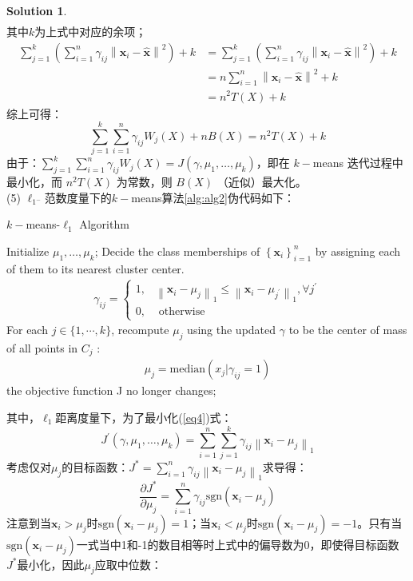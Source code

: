 \documentclass[a4paper,UTF8]{article}
\theoremstyle{definition}
\newtheorem*{solution}{Solution}
\begin{document}
\begin{solution}
\begin{align*}
	\end{align*}
	其中$k$为上式中对应的余项；
	\begin{align*}
	\sum_{j=1}^{k}\left(\sum_{i=1}^{n}\gamma_{i j}\left\|\mathbf{x}_{i}-\hat{\mathbf{x}}\right\|^{2}\right)+k&=\sum_{j=1}^{k}\left(\sum_{i=1}^{n}\gamma_{i j}\left\|\mathbf{x}_{i}-\hat{\mathbf{x}}\right\|^{2}\right)+k\\&=n\sum_{i=1}^{n}\left\|\mathbf{x}_{i}-\hat{\mathbf{x}}\right\|^{2}+k\\&=n^2T(X)+k
	\end{align*}	
	综上可得：$$\sum_{j=1}^{k}\sum_{i=1}^{n}\gamma_{i j}W_j(X)+nB(X)=n^2T(X)+k$$ 
	由于：$\sum_{j=1}^{k}\sum_{i=1}^{n}\gamma_{i j}W_j(X)=J\left(\gamma, \mu_{1}, \ldots, \mu_{k}\right)$，即在 $k-$means 迭代过程中最小化，而 $n^2T(X)$ 为常数，则 $B(X)$ （近似）最大化。
 \\(5) $\ell_{1^{-}}$范数度量下的$k-$means算法\ref{alg:alg2}伪代码如下：\\
 {\begin{algorithm}[htbp]
		\caption{ $k-$means-$\ell_1$ Algorithm }
		\label{alg:alg2}
		\begin{algorithmic}[1]{
				\STATE Initialize $\mu_{1}, \ldots, \mu_{k}$;
				\REPEAT
				 Decide the class memberships of $\left\{\mathbf{x}_{i}\right\}_{i=1}^{n}$ by assigning each of them to its nearest cluster center.
				\begin{align}\nonumber\gamma_{i j}=\left\{\begin{array}{ll}
				1, & \left\|\mathbf{x}_{i}-\mu_{j}\right\|_{1} \leq\left\|\mathbf{x}_{i}-\mu_{j^{\prime}}\right\|_{1}, \forall j^{\prime} \\
				0, & \text { otherwise }
				\end{array}\right.\end{align}
				 For each $j \in\{1, \cdots, k\}$, recompute $\mu_j$ using the updated $\gamma$ to be	the center of mass of all points in $C_j$ :
			\begin{align}\nonumber\mu_{j}=\text{median}(x_j|\gamma_{i j}=1)
			\end{align}	
				\UNTIL the objective function J no longer changes;}
		\end{algorithmic}
\end{algorithm}}
其中，$\ell_1$距离度量下，为了最小化(\ref{eq4})式：
$$J^{\prime}\left(\gamma, \mu_{1}, \ldots, \mu_{k}\right)=\sum_{i=1}^{n} \sum_{j=1}^{k} \gamma_{i j}\left\|\mathbf{x}_{i}-\mu_{j}\right\|_{1}$$
考虑仅对$\mu_j$的目标函数：$J^*=\sum_{i=1}^{n}\gamma_{i j}\left\|\mathbf{x}_{i}-\mu_{j}\right\|_{1}$求导得：$$\frac{\partial J^*}{\partial\mu_j}=\sum_{i=1}^{n}\gamma_{i j}\text{sgn}\left(\mathbf{x}_{i}-\mu_{j}\right)$$注意到当$\mathbf{x}_{i}>\mu_{j}$时$\text{sgn}\left(\mathbf{x}_{i}-\mu_{j}\right)=1$；当$\mathbf{x}_{i}<\mu_{j}$时$\text{sgn}\left(\mathbf{x}_{i}-\mu_{j}\right)=-1$。只有当$\text{sgn}\left(\mathbf{x}_{i}-\mu_{j}\right)$一式当中1和-1的数目相等时上式中的偏导数为0，即使得目标函数$J^*$最小化，因此$\mu_j$应取中位数：

\end{solution}
\end{document}
